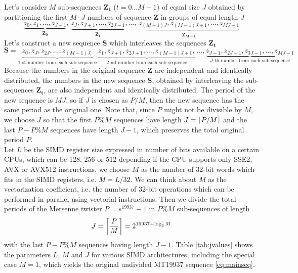 \documentclass[preprint,1p,times]{elsarticle}
\begin{document}
\noindent Let's consider $M$ sub-sequences $\boldsymbol{Z_t}$ ($t=0\dots M-1$) of equal size $J$ obtained by partitioning the first $M\cdot J$ numbers of sequence $\boldsymbol{Z}$ in groups of equal length $J$
\begin{equation}
\label{eq:subseq}
   \underbrace{z_0, z_1, \dots, z_{J-1}}_{\boldsymbol{Z_0}},\, \underbrace{z_J, z_{J+1}, \dots, z_{2J-1}}_{\boldsymbol{Z_1}}, \dots,\, \underbrace{z_{(M-1)J}, z_{(M-1)J+1}, \dots, z_{MJ-1}}_{\boldsymbol{Z_{M-1}}}
\end{equation}
Let's construct a new sequence $\boldsymbol{S}$ which interleaves the sequences $\boldsymbol{Z_t}$
\begin{equation}
\label{eq:combseq}
   \boldsymbol{S}=\underbrace{z_0, z_J, z_{2J}, \dots, z_{(M-1)J,}}_{\text{1-st number from each sub-sequence}} \,\underbrace{z_1, z_{J+1}, z_{2J+1}, \dots, z_{(M-1)J+1},}_{\text{2-nd number from each sub-sequence}}\, \dots, \underbrace{z_{J-1}, z_{2J-1}, z_{3J-1}, \dots, z_{MJ-1}}_{\text{$J$-th number from each sub-sequence}}
\end{equation}
Because the numbers in the original sequence $\boldsymbol{Z}$ are independent and identically distributed, the numbers in the new sequence $\boldsymbol{S}$, obtained by interleaving the sub-sequences $\boldsymbol{Z_t}$, are also independent and identically distributed. The period of the new sequence is $MJ$, so if $J$ is chosen as $P/M$, then the new sequence has the same period as the original one. Note that, since $P$ might not be divisible by $M$, we choose $J$ so that the first $P \% M$ sequences have length $J=\left\lceil{P/M}\right\rceil$ and the last $P - P \% M$ sequences have length $J-1$, which preserves the total original period $P$. \\

\noindent Let $L$ be the SIMD register size expressed in number of bits available on a certain CPUs, which can be 128, 256 or 512 depending if the CPU supports only SSE2, AVX or AVX512 instructions, we choose $M$ as the number of 32-bit words which fits in the SIMD registers, i.e. $M=L/32$.
We can think about $M$ as the vectorization coefficient, i.e. the number of 32-bit operations which can be performed in parallel using vectorial instructions.
Then we divide the total periods of the Mersenne twister $P=s^{19937}-1$ in $P \% M$ sub-sequences of length
$$J=\left\lceil{\frac{P}{M}}\right\rceil=2^{19937-\log_2M}$$
with the last $P - P \% M$ sequences having length $J-1$. Table \ref{tab:jvalues} shows the parameters $L$, $M$ and $J$ for various SIMD architectures, including the special case $M=1$, which yields the original undivided MT19937 sequence \eqref{eq:mainseq}.
\end{document}
